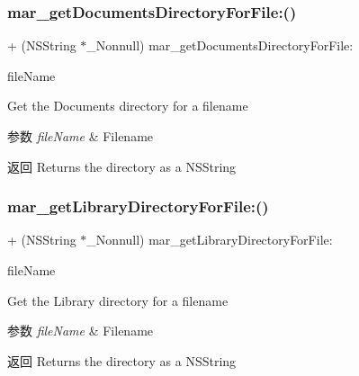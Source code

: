 \subsubsection{\texorpdfstring{mar\+\_\+get\+Documents\+Directory\+For\+File\+:()}{mar\_getDocumentsDirectoryForFile:()}}
{\footnotesize\ttfamily + (N\+S\+String $\ast$\+\_\+\+Nonnull) mar\+\_\+get\+Documents\+Directory\+For\+File\+: \begin{DoxyParamCaption}\item[{(N\+S\+String $\ast$ \+\_\+\+Nonnull)}]{file\+Name }\end{DoxyParamCaption}}

Get the Documents directory for a filename


\begin{DoxyParams}{参数}
{\em file\+Name} & Filename\\
\hline
\end{DoxyParams}
\begin{DoxyReturn}{返回}
Returns the directory as a N\+S\+String 
\end{DoxyReturn}
\mbox{\label{category_n_s_file_manager_07_m_a_r_e_x_08_af80857d0bf3c6327dc0fe6ce23bc7a23}} 
\subsubsection{\texorpdfstring{mar\+\_\+get\+Library\+Directory\+For\+File\+:()}{mar\_getLibraryDirectoryForFile:()}}
{\footnotesize\ttfamily + (N\+S\+String $\ast$\+\_\+\+Nonnull) mar\+\_\+get\+Library\+Directory\+For\+File\+: \begin{DoxyParamCaption}\item[{(N\+S\+String $\ast$ \+\_\+\+Nonnull)}]{file\+Name }\end{DoxyParamCaption}}

Get the Library directory for a filename


\begin{DoxyParams}{参数}
{\em file\+Name} & Filename\\
\hline
\end{DoxyParams}
\begin{DoxyReturn}{返回}
Returns the directory as a N\+S\+String 
\end{DoxyReturn}
\mbox{\label{category_n_s_file_manager_07_m_a_r_e_x_08_afd1c2711d46813edd85bc8a6ca453460}} 
